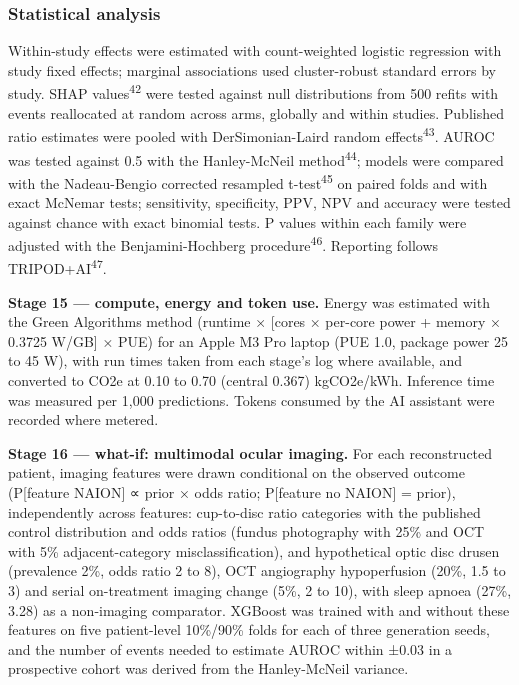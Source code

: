 \documentclass[
  11pt,
]{article}
\begin{document}
\subsubsection{Statistical analysis}\label{statistical-analysis}

Within-study effects were estimated with count-weighted logistic
regression with study fixed effects; marginal associations used
cluster-robust standard errors by study. SHAP values\textsuperscript{42}
were tested against null distributions from 500 refits with events
reallocated at random across arms, globally and within studies.
Published ratio estimates were pooled with DerSimonian-Laird random
effects\textsuperscript{43}. AUROC was tested against 0.5 with the
Hanley-McNeil method\textsuperscript{44}; models were compared with the
Nadeau-Bengio corrected resampled t-test\textsuperscript{45} on paired
folds and with exact McNemar tests; sensitivity, specificity, PPV, NPV
and accuracy were tested against chance with exact binomial tests. P
values within each family were adjusted with the Benjamini-Hochberg
procedure\textsuperscript{46}. Reporting follows
TRIPOD+AI\textsuperscript{47}.

\textbf{Stage 15 --- compute, energy and token use.} Energy was
estimated with the Green Algorithms method (runtime × {[}cores ×
per-core power + memory × 0.3725 W/GB{]} × PUE) for an Apple M3 Pro
laptop (PUE 1.0, package power 25 to 45 W), with run times taken from
each stage's log where available, and converted to CO2e at 0.10 to 0.70
(central 0.367) kgCO2e/kWh. Inference time was measured per 1,000
predictions. Tokens consumed by the AI assistant were recorded where
metered.

\textbf{Stage 16 --- what-if: multimodal ocular imaging.} For each
reconstructed patient, imaging features were drawn conditional on the
observed outcome (P{[}feature \textbar{} NAION{]} ∝ prior × odds ratio;
P{[}feature \textbar{} no NAION{]} = prior), independently across
features: cup-to-disc ratio categories with the published control
distribution and odds ratios (fundus photography with 25\% and OCT with
5\% adjacent-category misclassification), and hypothetical optic disc
drusen (prevalence 2\%, odds ratio 2 to 8), OCT angiography
hypoperfusion (20\%, 1.5 to 3) and serial on-treatment imaging change
(5\%, 2 to 10), with sleep apnoea (27\%, 3.28) as a non-imaging
comparator. XGBoost was trained with and without these features on five
patient-level 10\%/90\% folds for each of three generation seeds, and
the number of events needed to estimate AUROC within ±0.03 in a
prospective cohort was derived from the Hanley-McNeil variance.
\end{document}
